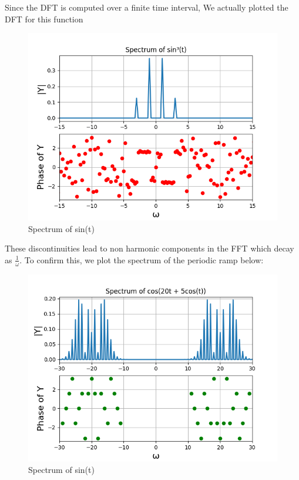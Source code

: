 \documentclass{article}
\begin{document}
Since the DFT is computed over a finite time interval, We actually plotted the DFT for this function
\begin{figure}[h!]
\centering
\includegraphics[scale=0.6]{Figure_3.png}
\caption{Spectrum of sin(t)}
\label{fig:universe}
\end{figure}

These discontinuities lead to  non harmonic components in the FFT which decay as \(\frac{1}{\omega}\). To confirm
this, we plot the spectrum of the periodic ramp below:
\begin{figure}[h!]
\centering
\includegraphics[scale=0.6]{Figure_4.png}
\caption{Spectrum of sin(t)}
\label{fig:universe}
\end{figure}
\end{document}
